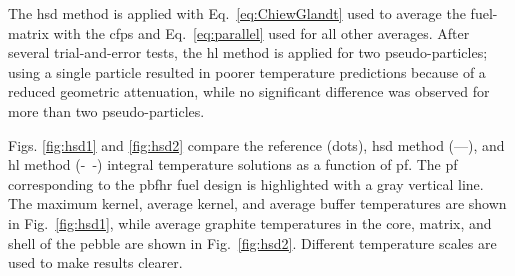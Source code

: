 The \gls{hsd} method is applied with Eq.\ \eqref{eq:ChiewGlandt} used to average the fuel-matrix with the \glspl{cfp} and Eq.\ \eqref{eq:parallel} used for all other averages. After several trial-and-error tests, the \gls{hl} method is applied for two pseudo-particles; using a single particle resulted in poorer temperature predictions because of a reduced geometric attenuation, while no significant difference was observed for more than two pseudo-particles.

Figs. \ref{fig:hsd1} and \ref{fig:hsd2} compare the reference (dots), \gls{hsd} method (---), and \gls{hl} method \mbox{(- -)} integral temperature solutions as a function of \gls{pf}. The \gls{pf} corresponding to the \gls{pbfhr} fuel design is highlighted with a gray vertical line. The maximum kernel, average kernel, and average buffer temperatures are shown in Fig.\ \ref{fig:hsd1}, while average graphite temperatures in the core, matrix, and shell of the pebble are shown in Fig.\ \ref{fig:hsd2}. Different temperature scales are used to make results clearer.

